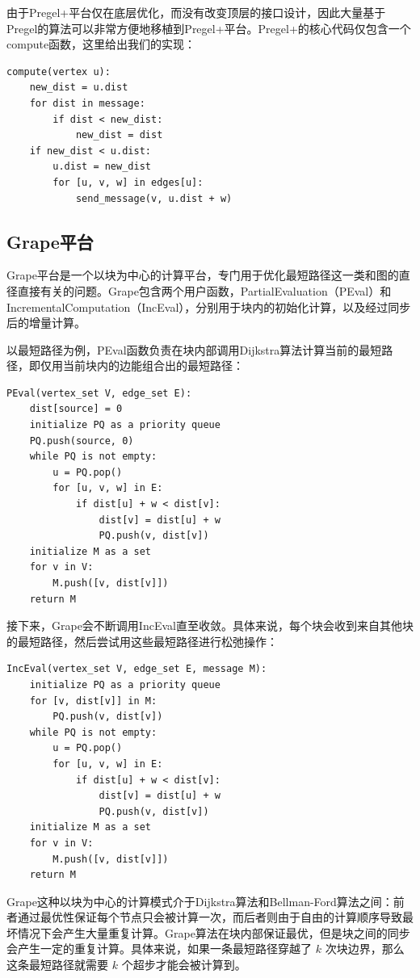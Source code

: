 由于Pregel+平台仅在底层优化，而没有改变顶层的接口设计，因此大量基于Pregel的算法可以非常方便地移植到Pregel+平台。Pregel+的核心代码仅包含一个compute函数，这里给出我们的实现：
\begin{lstlisting}
compute(vertex u):
    new_dist = u.dist
    for dist in message:
        if dist < new_dist:
            new_dist = dist
    if new_dist < u.dist:
        u.dist = new_dist
        for [u, v, w] in edges[u]:
            send_message(v, u.dist + w)
\end{lstlisting}


\subsection{Grape平台}

Grape平台是一个以块为中心的计算平台，专门用于优化最短路径这一类和图的直径直接有关的问题。Grape包含两个用户函数，PartialEvaluation（PEval）和IncrementalComputation（IncEval），分别用于块内的初始化计算，以及经过同步后的增量计算。

以最短路径为例，PEval函数负责在块内部调用Dijkstra算法计算当前的最短路径，即仅用当前块内的边能组合出的最短路径：
\begin{lstlisting}
PEval(vertex_set V, edge_set E):
    dist[source] = 0
    initialize PQ as a priority queue
    PQ.push(source, 0)
    while PQ is not empty:
        u = PQ.pop()
        for [u, v, w] in E:
            if dist[u] + w < dist[v]:
                dist[v] = dist[u] + w
                PQ.push(v, dist[v])
    initialize M as a set
    for v in V:
        M.push([v, dist[v]])
    return M
\end{lstlisting}

接下来，Grape会不断调用IncEval直至收敛。具体来说，每个块会收到来自其他块的最短路径，然后尝试用这些最短路径进行松弛操作：
\begin{lstlisting}
IncEval(vertex_set V, edge_set E, message M):
    initialize PQ as a priority queue
    for [v, dist[v]] in M:
        PQ.push(v, dist[v])
    while PQ is not empty:
        u = PQ.pop()
        for [u, v, w] in E:
            if dist[u] + w < dist[v]:
                dist[v] = dist[u] + w
                PQ.push(v, dist[v])
    initialize M as a set
    for v in V:
        M.push([v, dist[v]])
    return M
\end{lstlisting}

Grape这种以块为中心的计算模式介于Dijkstra算法和Bellman-Ford算法之间：前者通过最优性保证每个节点只会被计算一次，而后者则由于自由的计算顺序导致最坏情况下会产生大量重复计算。Grape算法在块内部保证最优，但是块之间的同步会产生一定的重复计算。具体来说，如果一条最短路径穿越了 $k$ 次块边界，那么这条最短路径就需要 $k$ 个超步才能会被计算到。

